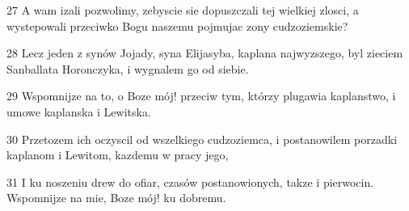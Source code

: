 \par 27 A wam izali pozwolimy, zebyscie sie dopuszczali tej wielkiej zlosci, a wystepowali przeciwko Bogu naszemu pojmujac zony cudzoziemskie?
\par 28 Lecz jeden z synów Jojady, syna Elijasyba, kaplana najwyzszego, byl zieciem Sanballata Horonczyka, i wygnalem go od siebie.
\par 29 Wspomnijze na to, o Boze mój! przeciw tym, którzy plugawia kaplanstwo, i umowe kaplanska i Lewitska.
\par 30 Przetozem ich oczyscil od wszelkiego cudzoziemca, i postanowilem porzadki kaplanom i Lewitom, kazdemu w pracy jego,
\par 31 I ku noszeniu drew do ofiar, czasów postanowionych, takze i pierwocin. Wspomnijze na mie, Boze mój! ku dobremu.


